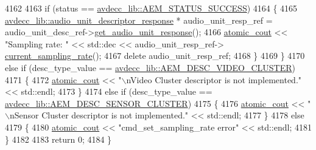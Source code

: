 \begin{DoxyCode}
4162 
4163         \textcolor{keywordflow}{if} (status == \hyperlink{namespaceavdecc__lib_affd436edb2cecd20cfd784a84f852b2bac947077909cb590b84f4b5db413080e0}{avdecc\_lib::AEM\_STATUS\_SUCCESS})
4164         \{
4165             \hyperlink{classavdecc__lib_1_1audio__unit__descriptor__response}{avdecc\_lib::audio\_unit\_descriptor\_response} * 
      audio\_unit\_resp\_ref = audio\_unit\_desc\_ref->\hyperlink{classavdecc__lib_1_1audio__unit__descriptor_a1bc85ccfad8fa58cab10f58a6797919d}{get\_audio\_unit\_response}();
4166             \hyperlink{cmd__line_8h_a0bc38ccc65c79ba06c6fcd7b4bf554c3}{atomic\_cout} << \textcolor{stringliteral}{"Sampling rate: "} << std::dec << audio\_unit\_resp\_ref->
      \hyperlink{classavdecc__lib_1_1audio__unit__descriptor__response_a115c8f2c1f0bd18abff75088d1932b02}{current\_sampling\_rate}();
4167             \textcolor{keyword}{delete} audio\_unit\_resp\_ref;
4168         \}
4169     \}
4170     \textcolor{keywordflow}{else} \textcolor{keywordflow}{if} (desc\_type\_value == \hyperlink{namespaceavdecc__lib_ac7b7d227e46bc72b63ee9e9aae15902fa2774c3076106c5643ace3a9e584f3ea0}{avdecc\_lib::AEM\_DESC\_VIDEO\_CLUSTER})
4171     \{
4172         \hyperlink{cmd__line_8h_a0bc38ccc65c79ba06c6fcd7b4bf554c3}{atomic\_cout} << \textcolor{stringliteral}{"\(\backslash\)nVideo Cluster descriptor is not implemented."} << std::endl;
4173     \}
4174     \textcolor{keywordflow}{else} \textcolor{keywordflow}{if} (desc\_type\_value == \hyperlink{namespaceavdecc__lib_ac7b7d227e46bc72b63ee9e9aae15902fa4c75b3f44e2393ef0f810ad6f074cea5}{avdecc\_lib::AEM\_DESC\_SENSOR\_CLUSTER})
4175     \{
4176         \hyperlink{cmd__line_8h_a0bc38ccc65c79ba06c6fcd7b4bf554c3}{atomic\_cout} << \textcolor{stringliteral}{"\(\backslash\)nSensor Cluster descriptor is not implemented."} << std::endl;
4177     \}
4178     \textcolor{keywordflow}{else}
4179     \{
4180         \hyperlink{cmd__line_8h_a0bc38ccc65c79ba06c6fcd7b4bf554c3}{atomic\_cout} << \textcolor{stringliteral}{"cmd\_set\_sampling\_rate error"} << std::endl;
4181     \}
4182 
4183     \textcolor{keywordflow}{return} 0;
4184 \}
\end{DoxyCode}


